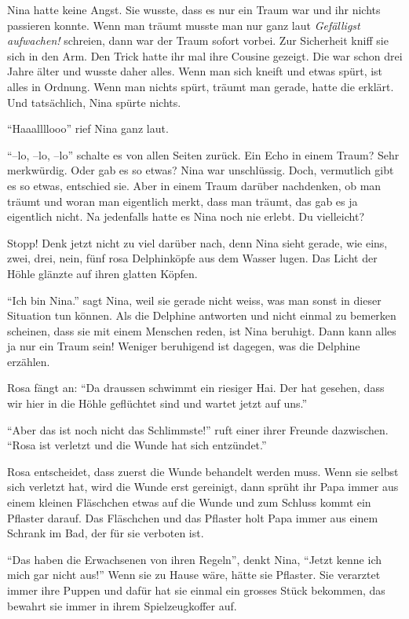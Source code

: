 Nina hatte keine Angst. Sie wusste, dass es nur ein Traum war und ihr nichts passieren konnte. Wenn man träumt musste man nur ganz laut {\it Gefälligst aufwachen!} schreien, dann war der Traum sofort vorbei. Zur Sicherheit kniff sie sich in den Arm. Den Trick hatte ihr mal ihre Cousine gezeigt. Die war schon drei Jahre älter und wusste daher alles. Wenn man sich kneift und etwas spürt, ist alles in Ordnung. Wenn man nichts spürt, träumt man gerade, hatte die erklärt. Und tatsächlich, Nina spürte nichts.

\enquote{Haaallllooo} rief Nina ganz laut.

\enquote{--lo, --lo, --lo} schalte es von allen Seiten zurück. Ein Echo in einem Traum? Sehr merkwürdig. Oder gab es so etwas? Nina war unschlüssig. Doch, vermutlich gibt es so etwas, entschied sie. Aber in einem Traum darüber nachdenken, ob man träumt und woran man eigentlich merkt, dass man träumt, das gab es ja eigentlich nicht. Na jedenfalls hatte es Nina noch nie erlebt. Du vielleicht?

Stopp! Denk jetzt nicht zu viel darüber nach, denn Nina sieht gerade, wie eins, zwei, drei, nein, fünf rosa Delphinköpfe aus dem Wasser lugen. Das Licht der Höhle glänzte auf ihren glatten Köpfen. 

\enquote{Ich bin Nina.} sagt Nina, weil sie gerade nicht weiss, was man sonst in dieser Situation tun können. Als die Delphine antworten und nicht einmal zu bemerken scheinen, dass sie mit einem Menschen reden, ist Nina beruhigt. Dann kann alles ja nur ein Traum sein! Weniger beruhigend ist dagegen, was die Delphine erzählen.

Rosa fängt an: \enquote{Da draussen schwimmt ein riesiger Hai. Der hat gesehen, dass wir hier in die Höhle geflüchtet sind und wartet jetzt auf uns.}

\enquote{Aber das ist noch nicht das Schlimmste!} ruft einer ihrer Freunde dazwischen. \enquote{Rosa ist verletzt und die Wunde hat sich entzündet.}

Rosa entscheidet, dass zuerst die Wunde behandelt werden muss. Wenn sie selbst sich verletzt hat, wird die Wunde erst gereinigt, dann sprüht ihr Papa immer aus einem kleinen Fläschchen etwas auf die Wunde und zum Schluss kommt ein Pflaster darauf. Das Fläschchen und das Pflaster holt Papa immer aus einem Schrank im Bad, der für sie verboten ist. 

\enquote{Das haben die Erwachsenen von ihren Regeln}, denkt Nina, \enquote{Jetzt kenne ich mich gar nicht aus!} Wenn sie zu Hause wäre, hätte sie Pflaster. Sie verarztet immer ihre Puppen und dafür hat sie einmal ein grosses Stück bekommen, das bewahrt sie immer in ihrem Spielzeugkoffer auf.

